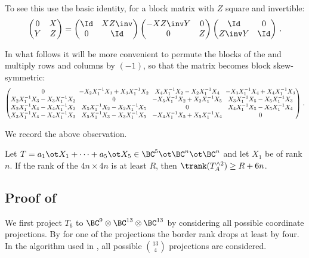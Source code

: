 \documentclass{toc}
\begin{document}
To see this use the basic identity, for a block matrix with 
$Z$ square and invertible: 
$$
\begin{pmatrix}
0&X\\ Y&Z\end{pmatrix}
=
\begin{pmatrix} 
\Id & XZ\inv \\ 0 &\Id\end{pmatrix}
\begin{pmatrix}
-XZ\inv Y & 0 \\ 0&Z\end{pmatrix} 
\begin{pmatrix} \Id & 0\\
Z\inv Y & \Id
\end{pmatrix}\,.
$$

\newcommand{\qw}{\hspace{-0.45em}}    %
%
In what follows it will be more convenient to permute the blocks of
the   %
and multiply rows and columns by $(-1)$, so that the matrix becomes block skew-symmetric:
\begin{equation}\label{p2matrixb}
\begin{pmatrix}
0&\qw 
-X_2X_1^{-1} X_3+X_3X_1^{-1}X_2 
&\qw  X_4X_1^{-1} X_2-X_2X_1^{-1}X_4&\qw 
-X_3X_1^{-1} X_4+X_4X_1^{-1}X_3
\\
X_2X_1^{-1} X_3-X_3X_1^{-1}X_2
&\qw 0&\qw -X_5X_1^{-1} X_2+X_2X_1^{-1}X_5&\qw 
X_3X_1^{-1} X_5-X_5X_1^{-1}X_3
\\
X_2X_1^{-1} X_4-X_4X_1^{-1}X_2
&\qw X_5X_1^{-1} X_2-X_2X_1^{-1}X_5
&\qw 0&\qw X_4X_1^{-1} X_5-X_5X_1^{-1}X_4
\\
X_3X_1^{-1} X_4-X_4X_1^{-1}X_3
&\qw X_5X_1^{-1} X_3-X_3X_1^{-1}X_5
&\qw -X_4X_1^{-1} X_5+X_5X_1^{-1}X_4&\qw 
0
\end{pmatrix}\,.
\end{equation}

We record the above observation. %

\begin{proposition}\label{blockred} Let $T=a_1\ot X_1+\cdots + a_5\ot X_5\in \BC^5\ot \BC^n\ot \BC^n$ and let $X_1$ be
of   rank $n$.
If   the rank of the $4n\times 4n$ 
is at least 
$R$, then $\trank(T_{A}^{\wedge 2})\geq R+6n$.
\end{proposition}

\subsection{Proof of }
We first project $T_6$ to $\BC^9\otimes \BC^{13}\otimes \BC^{13}$ by considering all possible coordinate projections. By  for one of the projections the border rank drops at least by four.
In the algorithm
used  in %
,  %
all possible $\binom{13}{4}$ projections are considered. 
\end{document}

